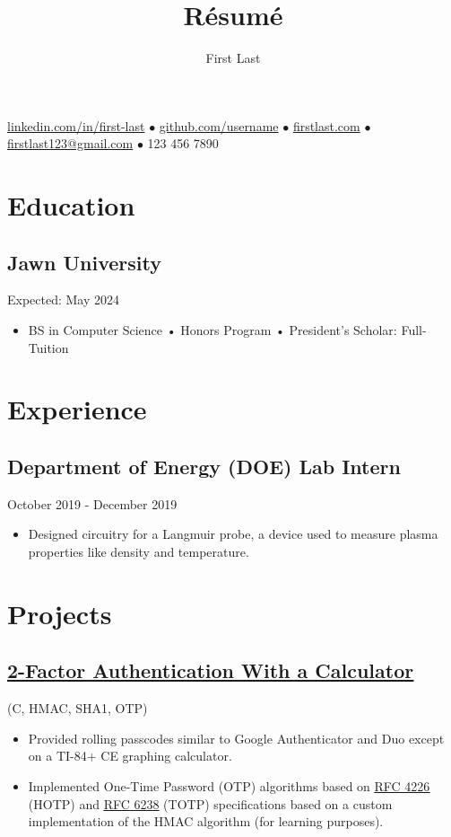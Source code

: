 \documentclass{article}
\makeatletter
\renewcommand{\maketitle}{
    \begin{center}
        {\huge\bfseries
        \theauthor}
    \end{center}
    \begin{center}
        \vspace{1em}
        \leavevmode
        \href{https://youtu.be/DLzxrzFCyOs}{linkedin.com/in/first-last} $\bullet$ \href{https://youtu.be/DLzxrzFCyOs}{github.com/username} $\bullet$ \href{https://youtu.be/DLzxrzFCyOs}{firstlast.com} $\bullet$ \href{https://youtu.be/DLzxrzFCyOs}{firstlast123@gmail.com} $\bullet$ 123 456 7890
    \end{center}
}
\makeatother
\begin{document}
\title{R\'esum\'e}
\author{First Last}

\maketitle
\section{Education}
\subsection{Jawn University} \hfill Expected: May 2024
\begin{itemize}
    \item BS in Computer Science • Honors Program • President's Scholar: Full-Tuition
\end{itemize}

\section{Experience}
\subsection{Department of Energy (DOE) Lab Intern}\hfill October 2019 - December 2019
\begin{itemize}
    \item Designed circuitry for a Langmuir probe, a device used to measure plasma properties like density and temperature.
\end{itemize}

\section{Projects}
\subsection{\href{https://youtu.be/DLzxrzFCyOs}{\underline{2-Factor Authentication With a Calculator}}} \hfill (C, HMAC, SHA1, OTP)
\begin{itemize}
    \item Provided rolling passcodes similar to Google Authenticator and Duo except on a TI-84+ CE graphing calculator.
    \item Implemented One-Time Password (OTP) algorithms based on \href{https://tools.ietf.org/html/rfc4226}{\underline{RFC 4226}} (HOTP) and \href{https://tools.ietf.org/html/rfc6238}{\underline{RFC 6238}} (TOTP) specifications based on a custom implementation of the HMAC algorithm (for learning purposes).
\end{itemize}
\end{document}
